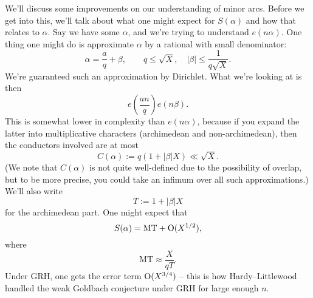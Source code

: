 \documentclass[reqno]{amsart} 
\begin{document}
We'll discuss some improvements on our understanding of minor arcs.  Before we get into this, we'll talk about what one might expect for $S(\alpha)$ and how that relates to $\alpha$.  Say we have some $\alpha$, and we're trying to understand $e(n \alpha)$.  One thing one might do is approximate $\alpha$ by a rational with small denominator:
\begin{equation*}
  \alpha = \frac{a}{q} + \beta , \qquad
  q \leq \sqrt{X}, \quad
  \lvert \beta \rvert \leq \frac{1}{q \sqrt{X}}.
\end{equation*}
We're guaranteed such an approximation by Dirichlet.  What we're looking at is then
\begin{equation*}
  e \left( \frac{a n}{q} \right)
  e(n \beta).
\end{equation*}
This is somewhat lower in complexity than $e(n \alpha)$, because if you expand the latter into multiplicative characters (archimedean and non-archimedean), then the conductors involved are at most
\begin{equation*}
  C(\alpha) := q(1 + \lvert \beta \rvert X) \ll \sqrt{X}.
\end{equation*}
(We note that $C(\alpha)$ is not quite well-defined due to the possibility of overlap, but to be more precise, you could take an infimum over all such approximations.)  We'll also write
\begin{equation*}
  T := 1 + \lvert \beta \rvert X
\end{equation*}
for the archimedean part.  One might expect that
\begin{equation*}
  S(\alpha) = \mathrm{MT} + \operatorname{O}(X^{1/2}),
\end{equation*}
where
\begin{equation*}
  \mathrm{MT} \approx \frac{X}{q T}.
\end{equation*}
Under GRH, one gets the error term $\operatorname{O}(X^{3/4})$ -- this is how Hardy--Littlewood handled the weak Goldbach conjecture under GRH for large enough $n$.
\end{document}
